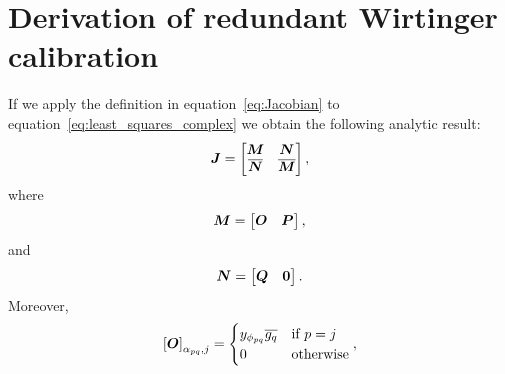 \documentclass[useAMS,usenatbib]{mn2e}
\newcommand{\bA}{\bmath{A}}
\newcommand{\bJ}{\bmath{J}}
\newcommand{\bN}{\bmath{N}}
\newcommand{\bM}{\bmath{M}}
\newcommand{\bO}{\bmath{O}}
\newcommand{\bP}{\bmath{P}}
\newcommand{\bQ}{\bmath{Q}}
\newcommand{\bzero}{\bmath{0}}
\newcommand{\conj}[1]{\overline{#1}}
\begin{document}
% 

\section{Derivation of redundant Wirtinger calibration}
\label{sec:analytic}
If we apply the definition in equation~\ref{eq:Jacobian} to equation~\ref{eq:least_squares_complex} we obtain the following analytic result:
\begin{equation}
\label{eq:Jacobian_red}
\bJ = \begin{bmatrix}
       \bM & \bN\\
       \conj{\bN} & \conj{\bM}
      \end{bmatrix},
\end{equation}
where
\begin{equation}
\bM =\begin{bmatrix}
      \bO & \bP
     \end{bmatrix},
\end{equation}
and 
\begin{equation}
\bN = \begin{bmatrix}
       \bQ & \bzero
      \end{bmatrix}.
\end{equation}
Moreover,
\begin{equation}
\left [ \bO  \right ]_{\alpha_{pq},j} = \begin{cases}
                                         y_{\phi_{pq}}\conj{g_q} & \textrm{if}~p=j\\
                                         0  & \textrm{otherwise} 
                                        \end{cases},
\end{equation}
\end{document}
